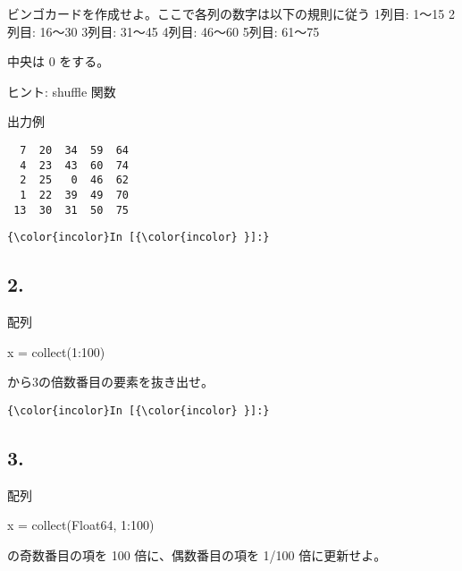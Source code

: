 \documentclass[a4paper,dvipdfmx,uplatex]{jsarticle}
\newenvironment{Shaded}{}{}
\newcommand{\DataTypeTok}[1]{\textcolor[rgb]{0.56,0.13,0.00}{{#1}}}
\newcommand{\FloatTok}[1]{\textcolor[rgb]{0.25,0.63,0.44}{{#1}}}
\newcommand{\NormalTok}[1]{{#1}}
\begin{document}
ビンゴカードを作成せよ。ここで各列の数字は以下の規則に従う 1列目: 1〜15
2列目: 16〜30 3列目: 31〜45 4列目: 46〜60 5列目: 61〜75

中央は 0 をする。

ヒント: shuffle 関数

出力例

\begin{verbatim}
  7  20  34  59  64 
  4  23  43  60  74 
  2  25   0  46  62 
  1  22  39  49  70 
 13  30  31  50  75 
\end{verbatim}

    \begin{Verbatim}[commandchars=\\\{\}]
{\color{incolor}In [{\color{incolor} }]:} 
\end{Verbatim}

    \subsection{2.}\label{section}

配列

\begin{Shaded}
\begin{Highlighting}[]
    \NormalTok{x = collect(}\FloatTok{1}\NormalTok{:}\FloatTok{100}\NormalTok{)}
\end{Highlighting}
\end{Shaded}

から3の倍数番目の要素を抜き出せ。

    \begin{Verbatim}[commandchars=\\\{\}]
{\color{incolor}In [{\color{incolor} }]:} 
\end{Verbatim}

    \subsection{3.}\label{section}

配列

\begin{Shaded}
\begin{Highlighting}[]
    \NormalTok{x = collect(}\DataTypeTok{Float64}\NormalTok{, }\FloatTok{1}\NormalTok{:}\FloatTok{100}\NormalTok{)}
\end{Highlighting}
\end{Shaded}

の奇数番目の項を 100 倍に、偶数番目の項を 1/100 倍に更新せよ。
\end{document}
